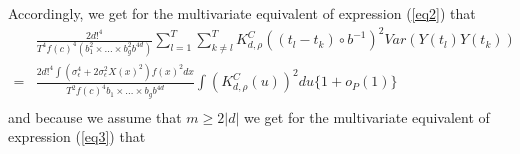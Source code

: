 Accordingly, we get for the multivariate equivalent of expression (\ref{eq2}) that
\begin{equation}
\begin{split}
& \frac{2 d!^4}{T^4 f(c)^4 (b_1^2 \times \dots \times b_g^2 b^{4d})} \sum_{l=1}^T \sum_{k \neq l}^T  K_{d,\rho}^{C} \left((t_{l}-t_{k}) \circ b^{-1} \right)^2 Var( Y(t_{l}) Y(t_{k}))  \\
=& \frac{2 d!^4   \int (\sigma_{\epsilon}^4 + 2\sigma_{\epsilon}^2 X(x)^2)  f(x)^2 dx}{T^2 f(c)^4 b_1 \times \dots \times b_g b^{4d}} \int \left(   K_{d,\rho}^C(u)  \right)^2du \{1+o_P(1)\}\\
\end{split}
\end{equation}
and because we assume that  $m\geq 2 |d|$ we get for the multivariate equivalent of expression (\ref{eq3}) that 
